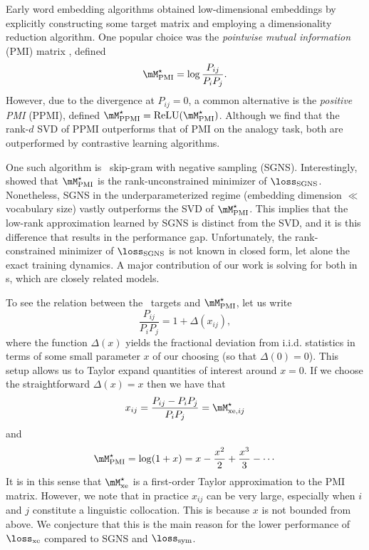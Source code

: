 Early word embedding algorithms obtained low-dimensional embeddings by explicitly constructing some target matrix and employing a dimensionality reduction algorithm. One popular choice was the \textit{pointwise mutual information} (PMI) matrix \citep{church1990word}, defined
\begin{equation}
    \Mstar_\mathrm{PMI} = \log \frac{P_{ij}}{P_i P_j}.
\end{equation}
However, due to the divergence at $P_{ij}=0$, a common alternative is the \textit{positive PMI} (PPMI), defined $\Mstar_\mathrm{PPMI}=\mathrm{ReLU}(\Mstar_\mathrm{PMI})$. Although we find that the rank-$d$ SVD of PPMI outperforms that of PMI on the analogy task, both are outperformed by contrastive learning algorithms.

One such algorithm is \wtv\ skip-gram with negative sampling (SGNS). Interestingly, \cite{levy2014neural} showed that $\Mstar_\mathrm{PMI}$ is the rank-unconstrained minimizer of $\loss_\mathrm{SGNS}$. Nonetheless, SGNS in the underparameterized regime (embedding dimension $\ll$ vocabulary size) vastly outperforms the SVD of $\Mstar_\mathrm{PMI}$. This implies that the low-rank approximation learned by SGNS is distinct from the SVD, and it is this difference that results in the performance gap. Unfortunately, the rank-constrained minimizer of $\loss_\mathrm{SGNS}$ is not known in closed form, let alone the exact training dynamics. A major contribution of our work is solving for both in \wem s, which are closely related models.

To see the relation between the \wem\ targets and $\Mstar_\mathrm{PMI}$, let us write
\begin{equation}
    \frac{P_{ij}}{P_i P_j} = 1+\Delta(x_{ij}),
\end{equation}
where the function $\Delta(x)$ yields the fractional deviation from i.i.d. statistics in terms of some small parameter $x$ of our choosing (so that $\Delta(0)=0$). This setup allows us to Taylor expand quantities of interest around $x=0$. If we choose the straightforward $\Delta(x)=x$ then we have that
\begin{equation}
    x_{ij} = \frac{P_{ij} - P_i P_j}{P_i P_j} = \Mstarxeij 
\end{equation}
and
\begin{equation}
    \Mstar_\mathrm{PMI} = \log(1+x) = x - \frac{x^2}{2} + \frac{x^3}{3} - \cdots
\end{equation}
It is in this sense that $\Mstarxe$ is a first-order Taylor approximation to the PMI matrix. However, we note that in practice $x_{ij}$ can be very large, especially when $i$ and $j$ constitute a linguistic collocation. This is because $x$ is not bounded from above. We conjecture that this is the main reason for the lower performance of $\lossxe$ compared to SGNS and $\losssym$.

